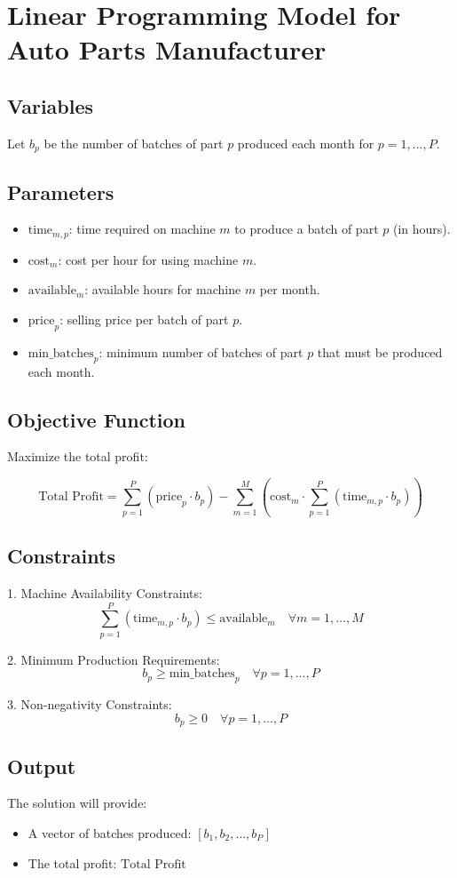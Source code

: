 \documentclass{article}
\begin{document}
\section*{Linear Programming Model for Auto Parts Manufacturer}

\subsection*{Variables}
Let \( b_p \) be the number of batches of part \( p \) produced each month for \( p = 1, \ldots, P \).

\subsection*{Parameters}
\begin{itemize}
    \item \( \text{time}_{m,p} \): time required on machine \( m \) to produce a batch of part \( p \) (in hours).
    \item \( \text{cost}_{m} \): cost per hour for using machine \( m \).
    \item \( \text{available}_{m} \): available hours for machine \( m \) per month.
    \item \( \text{price}_{p} \): selling price per batch of part \( p \).
    \item \( \text{min\_batches}_{p} \): minimum number of batches of part \( p \) that must be produced each month.
\end{itemize}

\subsection*{Objective Function}
Maximize the total profit:

\[
\text{Total Profit} = \sum_{p=1}^{P} \left( \text{price}_{p} \cdot b_p \right) - \sum_{m=1}^{M} \left( \text{cost}_{m} \cdot \sum_{p=1}^{P} \left( \text{time}_{m,p} \cdot b_p \right) \right)
\]

\subsection*{Constraints}
1. Machine Availability Constraints:
   \[
   \sum_{p=1}^{P} \left( \text{time}_{m,p} \cdot b_p \right) \leq \text{available}_{m} \quad \forall m = 1, \ldots, M
   \]

2. Minimum Production Requirements:
   \[
   b_p \geq \text{min\_batches}_{p} \quad \forall p = 1, \ldots, P
   \]

3. Non-negativity Constraints:
   \[
   b_p \geq 0 \quad \forall p = 1, \ldots, P
   \]

\subsection*{Output}
The solution will provide:
\begin{itemize}
    \item A vector of batches produced: \( [b_1, b_2, \ldots, b_P] \)
    \item The total profit: \( \text{Total Profit} \)
\end{itemize}
\end{document}
